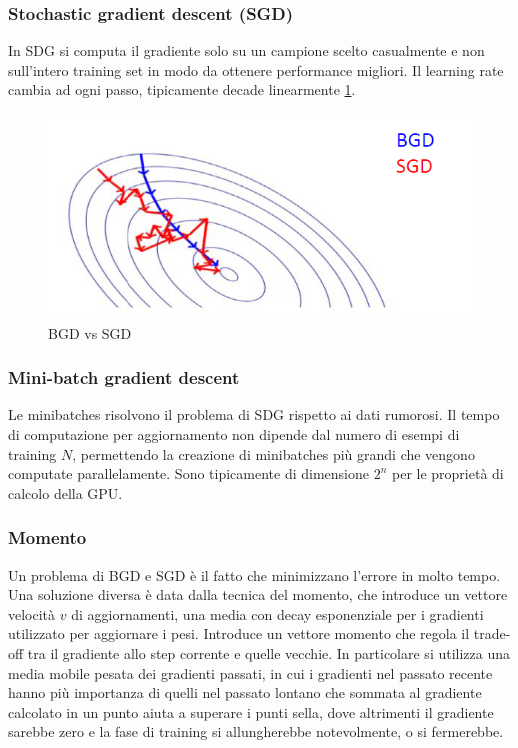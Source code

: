 		\subsubsection{Stochastic gradient descent (SGD)}
		In SDG si computa il gradiente solo su un campione scelto casualmente e non sull'intero training set in modo da ottenere performance migliori.
		Il learning rate cambia ad ogni passo, tipicamente decade linearmente \ref{fig:chapter11-11}.
		
		
		
		\begin{figure}
			\centering
			\includegraphics[width=0.6\linewidth]{imgs/chapter11/img11}
			\caption{BGD vs SGD}
			\label{fig:chapter11-11}
		\end{figure}
		
		\subsubsection{Mini-batch gradient descent}
		Le minibatches risolvono il problema di SDG rispetto ai dati rumorosi.
		Il tempo di computazione per aggiornamento non dipende dal numero di esempi di training $N$, permettendo la creazione di minibatches pi\`u grandi che vengono computate parallelamente.
		Sono tipicamente di dimensione $2^n$ per le propriet\`a di calcolo della GPU.
		
		\subsubsection{Momento}
		Un problema di BGD e SGD \`e il fatto che minimizzano l'errore in molto tempo.
		Una soluzione diversa \`e data dalla tecnica del momento, che introduce un vettore velocit\`a $v$ di aggiornamenti, una media con decay esponenziale per i gradienti utilizzato per aggiornare i pesi.
		Introduce un vettore momento che regola il trade-off tra il gradiente allo step corrente e quelle vecchie. 
		In particolare si utilizza una media mobile pesata dei gradienti passati, in cui i gradienti nel passato recente hanno pi\`u importanza di quelli nel passato lontano che sommata al gradiente calcolato in un punto aiuta a superare i punti sella, dove altrimenti il gradiente sarebbe zero e la fase di training si allungherebbe notevolmente, o si fermerebbe. \\
		
		
